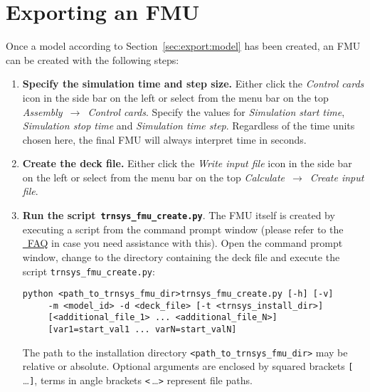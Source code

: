 \clearpage

\section{Exporting an FMU}
\label{sec:export:command}

Once a \trnsys model according to Section~\ref{sec:export:model} has been created, an FMU can be created with the following steps:
\begin{enumerate}
  \item \textbf{Specify the simulation time and step size.} Either click the \textit{Control cards} icon in the side bar on the left or select from the menu bar on the top \textit{Assembly}~$\rightarrow$~\textit{Control cards}. 
  Specify the values for \textit{Simulation start time}, \textit{Simulation stop time} and \textit{Simulation time step}.
  Regardless of the time units chosen here, the final FMU will always interpret time in seconds.
  \item \textbf{Create the deck file.} Either click the \textit{Write input file} icon in the side bar on the left or select from the menu bar on the top \textit{Calculate}~$\rightarrow$~\textit{Create input file}.
  \item \textbf{Run the script}~\textbf{\texttt{trnsys\_fmu\_create.py}}. The FMU itself is created by executing a \python script from the command prompt window (please refer to the \href{https://docs.python.org/2/faq/windows.html}{\python~FAQ} in case you need assistance with this).
  Open the command prompt window, change to the directory containing the deck file and execute the script \texttt{trnsys\_fmu\_create.py}:
  \begin{verbatim}
python <path_to_trnsys_fmu_dir>trnsys_fmu_create.py [-h] [-v] 
     -m <model_id> -d <deck_file> [-t <trnsys_install_dir>]
     [<additional_file_1> ... <additional_file_N>]
     [var1=start_val1 ... varN=start_valN]
  \end{verbatim}
  The path to the installation directory \verb!<path_to_trnsys_fmu_dir>! may be relative or absolute.
  Optional arguments are enclosed by squared brackets \verb![!$\,$\ldots\verb!]!, terms in angle brackets \verb!<!$\,$\ldots\verb!>! represent file paths.


\end{enumerate}
